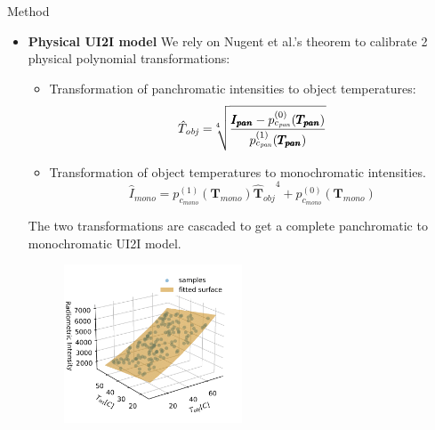 \documentclass[final]{beamer}
\newlength{\colwidth}
\begin{document}
\begin{frame}[t]
\begin{columns}[t]
\begin{column}{\colwidth}
\begin{alertblock}{Method}
    \begin{itemize} 
      \item \textbf{Physical UI2I model}\linebreak\linebreak
        We rely on Nugent et al.'s theorem to calibrate 2 physical polynomial transformations:
        \begin{itemize}
          \item Transformation of panchromatic intensities to object temperatures:
          \begin{equation*}
            \hat{T}_\mathit{obj} = \sqrt[\leftroot{5} 4]{\frac{\pmb{I_\mathit{pan}} - p^{(0)}_{c_\mathit{pan}}(\pmb{T_\mathit{pan}})}{p^{(1)}_{c_\mathit{pan}}(\pmb{T_\mathit{pan}})}}
          \end{equation*}
          \item Transformation of object temperatures to monochromatic intensities.
          \begin{equation*}
            \hat{I}_\mathit{mono} = p^{(1)}_{c_\mathit{mono}}(\pmb{T_\mathit{mono}}) \pmb{\hat{T}_\mathit{obj}}^4 + p^{(0)}_{c_\mathit{mono}}(\pmb{T_\mathit{mono}})
          \end{equation*}
        \end{itemize}

        The two transformations are cascaded to get a complete panchromatic to monochromatic UI2I model.
        \begin{figure}
            \centering
            \includegraphics[width=0.5\textwidth]{../figs/methods/physical_model_tight.png}
        \end{figure}
    

\end{itemize}
\end{alertblock}
\end{column}
\end{columns}
\end{frame}
\end{document}
